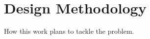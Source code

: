\chapter{Design Methodology}
\label{sec:design_methodology}

How this work plans to tackle the problem.
